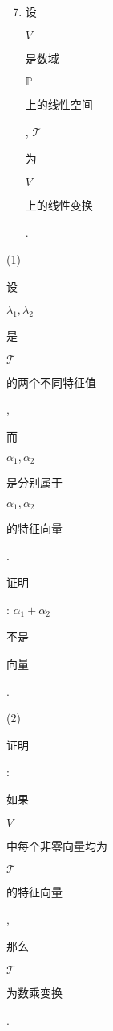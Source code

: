 \documentclass[10pt]{article}
\begin{document}
\begin{enumerate}
  \setcounter{enumi}{6}
  \item \begin{CJK}{UTF8}{mj}设\end{CJK} $V$ \begin{CJK}{UTF8}{mj}是数域\end{CJK} $\mathbb{P}$ \begin{CJK}{UTF8}{mj}上的线性空间\end{CJK}, $\mathscr{T}$ \begin{CJK}{UTF8}{mj}为\end{CJK} $V$ \begin{CJK}{UTF8}{mj}上的线性变换\end{CJK}.
\end{enumerate}
(1) \begin{CJK}{UTF8}{mj}设\end{CJK} $\lambda_{1}, \lambda_{2}$ \begin{CJK}{UTF8}{mj}是\end{CJK} $\mathscr{T}$ \begin{CJK}{UTF8}{mj}的两个不同特征值\end{CJK}, \begin{CJK}{UTF8}{mj}而\end{CJK} $\alpha_{1}, \alpha_{2}$ \begin{CJK}{UTF8}{mj}是分别属于\end{CJK} $\alpha_{1}, \alpha_{2}$ \begin{CJK}{UTF8}{mj}的特征向量\end{CJK}. \begin{CJK}{UTF8}{mj}证明\end{CJK}: $\alpha_{1}+\alpha_{2}$ \begin{CJK}{UTF8}{mj}不是\end{CJK} \begin{CJK}{UTF8}{mj}向量\end{CJK}.

(2) \begin{CJK}{UTF8}{mj}证明\end{CJK}: \begin{CJK}{UTF8}{mj}如果\end{CJK} $V$ \begin{CJK}{UTF8}{mj}中每个非零向量均为\end{CJK} $\mathscr{T}$ \begin{CJK}{UTF8}{mj}的特征向量\end{CJK}, \begin{CJK}{UTF8}{mj}那么\end{CJK} $\mathscr{T}$ \begin{CJK}{UTF8}{mj}为数乘变换\end{CJK}.
\end{document}
